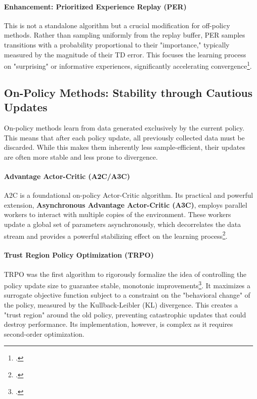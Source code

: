 \paragraph{Enhancement: Prioritized Experience Replay (PER)}
This is not a standalone algorithm but a crucial modification for off-policy methods. Rather than sampling uniformly from the replay buffer, PER samples transitions with a probability proportional to their "importance," typically measured by the magnitude of their TD error. This focuses the learning process on "surprising" or informative experiences, significantly accelerating convergence\footcite{schaul2015prioritized}.

\subsection{On-Policy Methods: Stability through Cautious Updates}
On-policy methods learn from data generated exclusively by the current policy. This means that after each policy update, all previously collected data must be discarded. While this makes them inherently less sample-efficient, their updates are often more stable and less prone to divergence.

\paragraph{Advantage Actor-Critic (A2C/A3C)}
A2C is a foundational on-policy Actor-Critic algorithm. Its practical and powerful extension, \textbf{Asynchronous Advantage Actor-Critic (A3C)}, employs parallel workers to interact with multiple copies of the environment. These workers update a global set of parameters asynchronously, which decorrelates the data stream and provides a powerful stabilizing effect on the learning process\footcite{mnih2016asynchronous}.

\paragraph{Trust Region Policy Optimization (TRPO)}
TRPO was the first algorithm to rigorously formalize the idea of controlling the policy update size to guarantee stable, monotonic improvements\footcite{schulman2020trust}. It maximizes a surrogate objective function subject to a constraint on the "behavioral change" of the policy, measured by the Kullback-Leibler (KL) divergence. This creates a "trust region" around the old policy, preventing catastrophic updates that could destroy performance. Its implementation, however, is complex as it requires second-order optimization.

